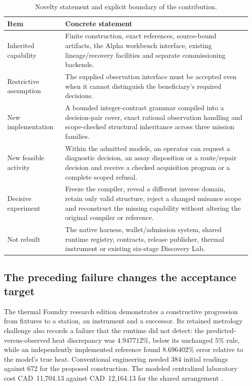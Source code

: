 \documentclass[11pt,letterpaper]{article}
\theoremstyle{definition}\newtheorem{definition}[theorem]{Definition}
\theoremstyle{remark}\newtheorem{remark}[theorem]{Remark}
\begin{document}
\begin{table}[htbp]
\centering\small
\caption{Novelty statement and explicit boundary of the contribution.}
\label{tab:novelty}
\begin{tabularx}{\linewidth}{@{}P{.22\linewidth}Y@{}}
\toprule
Item & Concrete statement \\
\midrule
Inherited capability & Finite construction, exact references, source-bound artifacts, the Alpha workbench interface, existing lineage/recovery facilities and separate commissioning backends. \\
Restrictive assumption & The supplied observation interface must be accepted even when it cannot distinguish the beneficiary's required decisions. \\
New implementation & A bounded integer-contrast grammar compiled into a decision-pair cover, exact rational observation handling and scope-checked structural inheritance across three mission families. \\
New feasible activity & Within the admitted models, an operator can request a diagnostic decision, an assay disposition or a route/repair decision and receive a checked acquisition program or a complete scoped refusal. \\
Decisive experiment & Freeze the compiler, reveal a different inverse domain, retain only valid structure, reject a changed nuisance scope and reconstruct the missing capability without altering the original compiler or reference. \\
Not rebuilt & The native harness, wallet/admission system, shared runtime registry, contracts, release publisher, thermal instrument or existing six-stage Discovery Lab. \\
\bottomrule
\end{tabularx}
\end{table}

\subsection{The preceding failure changes the acceptance target}
The thermal Foundry research edition demonstrates a constructive progression from fixtures to a station, an instrument and a successor. Its retained metrology challenge also records a failure that the runtime did not detect: the predicted-versus-observed heat discrepancy was \(4.947712\%\), below its unchanged \(5\%\) rule, while an independently implemented reference found \(8.696402\%\) error relative to the model's true heat. Conventional engineering needed 384 initial readings against 672 for the proposed construction. The modeled centralized laboratory cost CAD~11,704.13 against CAD~12,164.13 for the shared arrangement \citep{thermalfoundry}.
\end{document}
